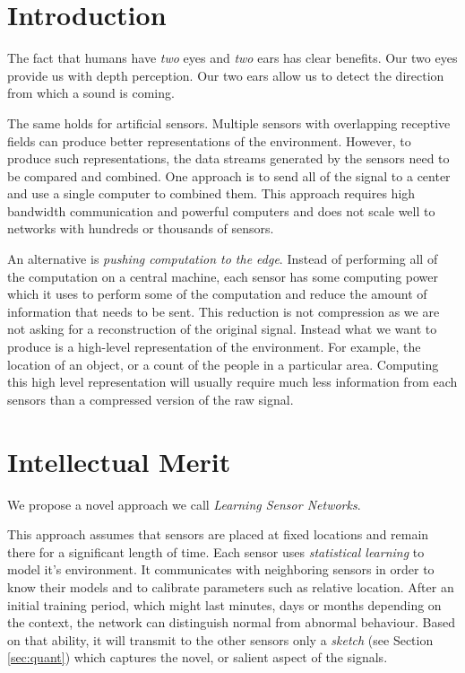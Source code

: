 \section{Introduction}
The fact that humans have {\em two} eyes and {\em two} ears has clear
benefits. Our two eyes provide us with depth perception. Our two ears
allow us to detect the direction from which a sound is coming.

The same holds for artificial sensors. Multiple sensors with
overlapping receptive fields can produce better representations of the
environment. However, to produce such representations, the data
streams generated by the sensors need to be compared and combined. One
approach is to send all of the signal to a center and use a single
computer to combined them. This approach requires high bandwidth
communication and powerful computers and does not scale well to
networks with hundreds or thousands of sensors.

An alternative is {\em pushing computation to the edge}. Instead of
performing all of the computation on a central machine, each sensor
has some computing power which it uses to perform some of the
computation and reduce the amount of information that needs to be
sent. This reduction is not compression as we are not asking for a
reconstruction of the original signal. Instead what we want to produce
is a high-level representation of the environment. For example, the
location of an object, or a count of the people in a particular
area. Computing this high level representation will usually require
much less information from each sensors than a compressed version of
the raw signal.

\section{Intellectual Merit}


We propose a novel approach we call {\em Learning Sensor Networks}.


This approach assumes that sensors are placed at fixed locations and
remain there for a significant length of time.  Each sensor uses {\em
  statistical learning} to model it's environment. It communicates
with neighboring sensors in order to know their models and to
calibrate parameters such as relative location. After an initial
training period, which might last minutes, days or months depending on
the context, the network can distinguish normal from abnormal
behaviour. Based on that ability, it will transmit to the other
sensors only a {\em sketch} (see Section \ref{sec:quant}) which captures the novel, or
salient aspect of the signals.

